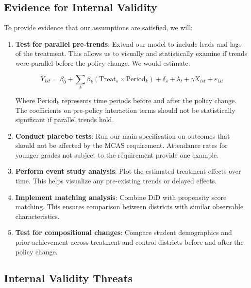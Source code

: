 \documentclass[12pt]{article}
\begin{document}
\subsection{Evidence for Internal Validity}

To provide evidence that our assumptions are satisfied, we will:

\begin{enumerate}
    \item \textbf{Test for parallel pre-trends}: Extend our model to include leads and lags of the treatment. This allows us to visually and statistically examine if trends were parallel before the policy change. We would estimate:

   \begin{equation}
   Y_{ist} = \beta_0 + \sum_k\beta_k(\text{Treat}_s \times \text{Period}_k) + \delta_s + \lambda_t + \gamma X_{ist} + \varepsilon_{ist}
   \end{equation}

   Where $\text{Period}_k$ represents time periods before and after the policy change. The coefficients on pre-policy interaction terms should not be statistically significant if parallel trends hold.

    \item \textbf{Conduct placebo tests}: Run our main specification on outcomes that should not be affected by the MCAS requirement. Attendance rates for younger grades not subject to the requirement provide one example.

    \item \textbf{Perform event study analysis}: Plot the estimated treatment effects over time. This helps visualize any pre-existing trends or delayed effects.

    \item \textbf{Implement matching analysis}: Combine DiD with propensity score matching. This ensures comparison between districts with similar observable characteristics.

    \item \textbf{Test for compositional changes}: Compare student demographics and prior achievement across treatment and control districts before and after the policy change.
\end{enumerate}

\subsection{Internal Validity Threats}
\end{document}
